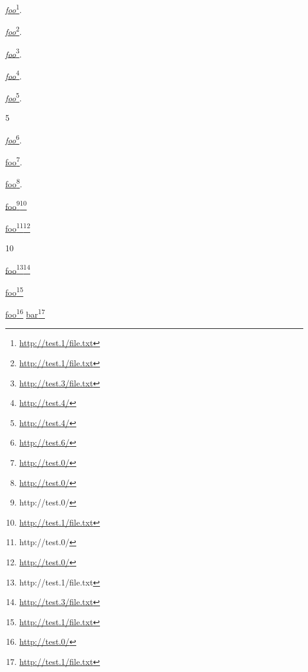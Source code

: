 
\def\mytitle{Reference Links}


\href{http://test.1/file.txt}{\emph{foo}}\footnote{\href{http://test.1/file.txt}{http:\slash{}\slash{}test.1\slash{}file.txt}}.

\href{http://test.1/file.txt}{\emph{foo}}\footnote{\href{http://test.1/file.txt}{http:\slash{}\slash{}test.1\slash{}file.txt}}.

\href{http://test.3/file.txt}{\emph{foo}}\footnote{\href{http://test.3/file.txt}{http:\slash{}\slash{}test.3\slash{}file.txt}}.

\href{http://test.4/}{\emph{foo}}\footnote{\href{http://test.4/}{http:\slash{}\slash{}test.4\slash{}}}.

\href{http://test.4/}{\emph{foo}}\footnote{\href{http://test.4/}{http:\slash{}\slash{}test.4\slash{}}}.

5

\href{http://test.6/}{\emph{foo}}\footnote{\href{http://test.6/}{http:\slash{}\slash{}test.6\slash{}}}.

\href{http://test.0/}{foo}\footnote{\href{http://test.0/}{http:\slash{}\slash{}test.0\slash{}}}.

\href{http://test.0/}{foo}\footnote{\href{http://test.0/}{http:\slash{}\slash{}test.0\slash{}}}.

\href{http://test.1/file.txt}{\href{http://test.0/}{foo}\footnote{\href{http://test.0/}{http:\slash{}\slash{}test.0\slash{}}}}\footnote{\href{http://test.1/file.txt}{http:\slash{}\slash{}test.1\slash{}file.txt}}

\href{http://test.0/}{\href{http://test.0/}{foo}\footnote{\href{http://test.0/}{http:\slash{}\slash{}test.0\slash{}}}}\footnote{\href{http://test.0/}{http:\slash{}\slash{}test.0\slash{}}}

10

\href{http://test.3/file.txt}{\href{http://test.1/file.txt}{foo}\footnote{\href{http://test.1/file.txt}{http:\slash{}\slash{}test.1\slash{}file.txt}}}\footnote{\href{http://test.3/file.txt}{http:\slash{}\slash{}test.3\slash{}file.txt}}

\href{http://test.1/file.txt}{foo}\footnote{\href{http://test.1/file.txt}{http:\slash{}\slash{}test.1\slash{}file.txt}}

\href{http://test.0/}{foo}\footnote{\href{http://test.0/}{http:\slash{}\slash{}test.0\slash{}}} \href{http://test.1/file.txt}{bar}\footnote{\href{http://test.1/file.txt}{http:\slash{}\slash{}test.1\slash{}file.txt}}

